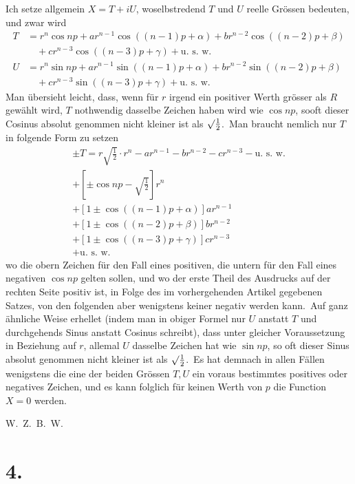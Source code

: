 \documentclass[12pt,a4paper]{article}
\theoremstyle{plain}
\begin{document}
Ich setze allgemein $X = T + iU$, woselbstredend $T$ und $U$ reelle Grössen bedeuten, und zwar wird
\begin{align*}
T &= r^n \cos np + ar^{n-1} \cos((n-1)p + \alpha) + br^{n-2} \cos((n-2)p + \beta) \\
&\quad + cr^{n-3} \cos((n-3)p + \gamma) + \text{u.\ s.\ w.} \\
U &= r^n \sin np + ar^{n-1} \sin((n-1)p + \alpha) + br^{n-2} \sin((n-2)p + \beta) \\
&\quad + cr^{n-3} \sin((n-3)p + \gamma) + \text{u.\ s.\ w.}
\end{align*}
Man übersieht leicht, dass, wenn für $r$ irgend ein positiver Werth grösser als $R$
gewählt wird, $T$ nothwendig dasselbe Zeichen haben wird wie $\cos np$, sooft
dieser Cosinus absolut genommen nicht kleiner ist als $\surd \frac{1}{2}$.\ Man braucht nemlich
nur $T$ in folgende Form zu setzen
\begin{multline*}
\pm T = r\sqrt{\tfrac{1}{2}} \cdot r^n - ar^{n-1} - br^{n-2} - cr^{n-3} - \text{u.\ s.\ w.} \\
+ [\pm \cos np - \sqrt{\tfrac{1}{2}}] r^n \\
+ [1 \pm \cos((n-1)p + \alpha)] ar^{n-1} \\
+ [1 \pm \cos((n-2)p + \beta)] br^{n-2} \\
+ [1 \pm \cos((n-3)p + \gamma)] cr^{n-3} \\
+ \text{u.\ s.\ w.}
\end{multline*}
wo die obern Zeichen für den Fall eines positiven, die untern für den Fall eines
negativen $\cos np$ gelten sollen, und wo der erste Theil des Ausdrucks auf der
rechten Seite positiv ist, in Folge des im vorhergehenden Artikel gegebenen Satzes,
von den folgenden aber wenigstens keiner negativ werden kann.\ Auf ganz ähnliche Weise erhellet (indem man in obiger Formel nur $U$ anstatt $T$ und durchgehends Sinus anstatt Cosinus schreibt), dass unter gleicher Voraussetzung in Beziehung auf $r$, allemal $U$ dasselbe Zeichen hat wie $\sin np$, so oft dieser Sinus
absolut genommen nicht kleiner ist als $\surd \frac{1}{2}$.\ Es hat demnach in allen Fällen wenigstens die eine der beiden Grössen $T, U$ ein voraus bestimmtes positives oder
negatives Zeichen, und es kann folglich für keinen Werth von $p$ die Function
$X = 0$ werden.

\hfill W.\ Z.\ B.\ W.

\section*{4.}
\end{document}
